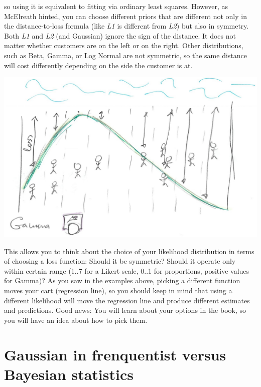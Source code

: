 \documentclass[
]{book}
\begin{document}
so using it is equivalent to fitting via ordinary least squares. However, as McElreath hinted, you can choose different priors that are different not only in the distance-to-loss formula (like \emph{L1} is different from \emph{L2}) but also in symmetry. Both \emph{L1} and \emph{L2} (and Gaussian) ignore the sign of the distance. It does not matter whether customers are on the left or on the right. Other distributions, such as Beta, Gamma, or Log Normal are not symmetric, so the same distance will cost differently depending on the side the customer is at.

\begin{center}\includegraphics[width=1\linewidth]{images/loss-functions-Gamma} \end{center}

This allows you to think about the choice of your likelihood distribution in terms of choosing a loss function: Should it be symmetric? Should it operate only within certain range (1..7 for a Likert scale, 0..1 for proportions, positive values for Gamma)? As you saw in the examples above, picking a different function moves your cart (regression line), so you should keep in mind that using a different likelihood will move the regression line and produce different estimates and predictions. Good news: You will learn about your options in the book, so you will have an idea about how to pick them.

\hypertarget{gaussian-in-frenquentist-versus-bayesian-statistics}{%
\section{Gaussian in frenquentist versus Bayesian statistics}\label{gaussian-in-frenquentist-versus-bayesian-statistics}}
\end{document}
